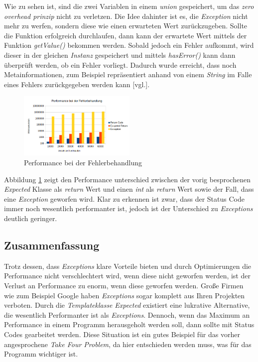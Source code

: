 Wie zu sehen ist, sind die zwei Variablen in einem \emph{union} gespeichert, um das \emph{zero
overhead prinzip} nicht zu verletzen. Die Idee dahinter ist es, die \emph{Exception} nicht mehr
zu werfen, sondern diese wie einen erwarteten Wert zurückzugeben. Sollte die Funktion
erfolgreich durchlaufen, dann kann der erwartete Wert mittels der Funktion \emph{getValue()}
bekommen werden. Sobald jedoch ein Fehler aufkommt, wird dieser in der gleichen \emph{Instanz}
gespeichert und mittels \emph{hasError()} kann dann überprüft werden, ob ein Fehler vorliegt.
Dadurch wurde erreicht, dass noch Metainformationen, zum Beispiel repräsentiert anhand von einem
\emph{String} im Falle eines Fehlers zurückgegeben werden kann \cite{OverheadExceptions}[vgl.].
\newline

\begin{figure}[h]
    \centering
    \includegraphics[width=0.5\textwidth]{bilder/Performance_Fehlerbehandlung}
    \caption[Fehlerbehandlung]{Performance bei der Fehlerbehandlung}
    \label{img:fehlerbehandlung}
\end{figure}

Abbildung \ref{img:fehlerbehandlung} zeigt den Performance unterschied zwischen der vorig
besprochenen \emph{Expected} Klasse als \emph{return} Wert und einen \emph{int} als \emph{return}
Wert sowie der Fall, dass eine \emph{Exception} geworfen wird. Klar zu erkennen ist zwar, dass
der Status Code immer noch wesentlich performanter ist, jedoch ist der Unterschied zu
\emph{Exceptions} deutlich geringer.

\subsection{Zusammenfassung}
Trotz dessen, dass \emph{Exceptions} klare Vorteile bieten und durch Optimierungen die
Performance nicht verschlechtert wird, wenn diese nicht geworfen werden, ist der Verlust an
Performance zu enorm, wenn diese geworfen werden. Große Firmen wie zum Beispiel Google haben
\emph{Exceptions} sogar komplett aus Ihren Projekten verboten. Durch die \emph{Templateklasse}
\emph{Expected} existiert eine lukrative Alternative, die wesentlich Performanter ist als
\emph{Exceptions}. Dennoch, wenn das Maximum an Performance in einem Programm herausgeholt werden
soll, dann sollte mit Status Codes gearbeitet werden. Diese Situation ist ein gutes Beispiel für
das vorher angesprochene \emph{Take Four Problem}, da hier entschieden werden muss, was für das
Programm wichtiger ist.